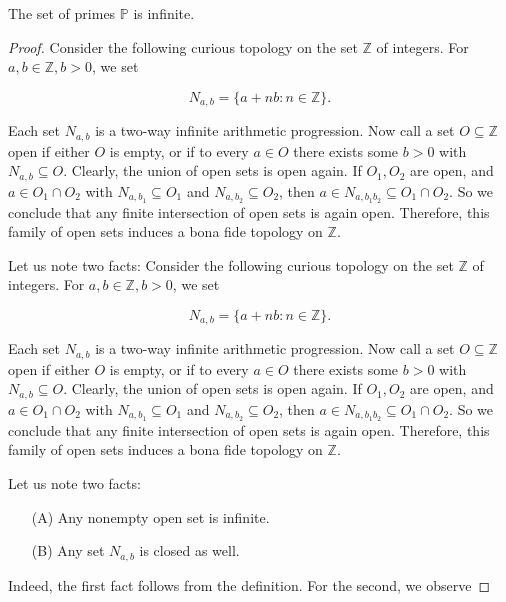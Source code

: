 \begin{theorem}
    \label{thm:fifth_proof}
    \leanok
    The set of primes \(\mathbb{P}\) is infinite.
\end{theorem}
\begin{proof}
   Consider the following curious topology on the set \(\mathbb{Z}\) of integers. For \(a, b \in \mathbb{Z}, b > 0\), we set

    \[
    N_{a,b} = \{a + nb : n \in \mathbb{Z}\}.
    \]

    Each set \(N_{a,b}\) is a two-way infinite arithmetic progression.
    Now call a set \(O \subseteq \mathbb{Z}\) open if either \(O\) is empty, or if to every \(a \in O\) there exists some \(b > 0\) with \(N_{a,b} \subseteq O\).
    Clearly, the union of open sets is open again. If \(O_1, O_2\) are open,
    and \(a \in O_1 \cap O_2\) with \(N_{a,b_1} \subseteq O_1\) and \(N_{a,b_2} \subseteq O_2\), then \(a \in N_{a, b_1 b_2} \subseteq O_1 \cap O_2\). So we conclude that any finite intersection of open sets is again open. Therefore, this family of open sets induces a bona fide topology on \(\mathbb{Z}\).

    Let us note two facts:
    Consider the following curious topology on the set \(\mathbb{Z}\) of integers. For \(a, b \in \mathbb{Z}, b > 0\), we set

    \[
    N_{a,b} = \{a + nb : n \in \mathbb{Z}\}.
    \]

    Each set \(N_{a,b}\) is a two-way infinite arithmetic progression.
    Now call a set \(O \subseteq \mathbb{Z}\) open if either \(O\) is empty, or if to every \(a \in O\) there exists some \(b > 0\) with \(N_{a,b} \subseteq O\).
    Clearly, the union of open sets is open again. If \(O_1, O_2\) are open, and \(a \in O_1 \cap O_2\) with \(N_{a,b_1} \subseteq O_1\) and \(N_{a,b_2} \subseteq O_2\),
    then \(a \in N_{a, b_1 b_2} \subseteq O_1 \cap O_2\). So we conclude that any finite intersection of open sets is again open.
    Therefore, this family of open sets induces a bona fide topology on \(\mathbb{Z}\).

    Let us note two facts:

    \begin{itemize}
        \item[(A)] Any nonempty open set is infinite.
        \item[(B)] Any set \(N_{a,b}\) is closed as well.
    \end{itemize}

    Indeed, the first fact follows from the definition. For the second, we observe


\end{proof}

